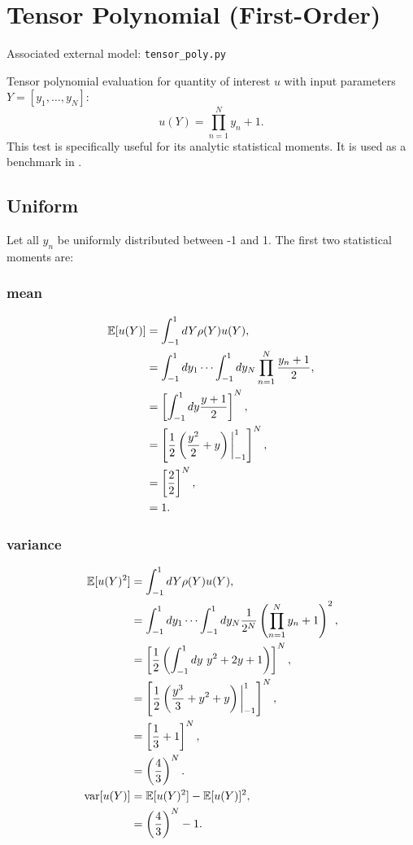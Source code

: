 \section{Tensor Polynomial (First-Order)}
Associated external model: \texttt{tensor\_poly.py}

Tensor polynomial evaluation for quantity of interest $u$ with input parameters $Y=[y_1,\ldots,y_N]$:
\begin{equation}
u(Y) = \prod_{n=1}^N y_n+1.
\end{equation}
This test is specifically useful for its analytic statistical moments.  It is used as a benchmark in
\cite{ayreseaton2015}.

\subsection{Uniform}
Let all $y_n$ be uniformly distributed between -1 and 1.  The first two statistical moments are:

\subsubsection{mean}
\begin{align}
\mathbb{E}[ u(Y)] &=\int_{-1}^1 dY \rho(Y)u(Y),\\
  &=\int_{-1}^1 dy_1\cdots\int_{-1}^1 dy_N \prod_{n=1}^N \frac{y_n+1}{2},\\
  &=\left[ \int_{-1}^1 dy \frac{y+1}{2}\right]^N,\\
  &=\left[\frac{1}{2}\left(\frac{y^2}{2}+y\right)\bigg|_{-1}^1\right]^N,\\
  &=\left[\frac{2}{2}\right]^N,\\
  &=1.
\end{align}

\subsubsection{variance}
\begin{align}
\mathbb{E}[ u(Y)^2] &= \int_{-1}^1 dY \rho(Y)u(Y),\\
  &=\int_{-1}^1 dy_1\cdots\int_{-1}^1 dy_N \frac{1}{2^N} \left(\prod_{n=1}^N y_n+1\right)^2,\\
  &=\left[\frac{1}{2}\left(\int_{-1}^1 dy\ y^2+2y+1 \right)\right]^N,\\
  &=\left[\frac{1}{2}\left(\frac{y^3}{3}+y^2+y \right)\bigg|_{-1}^1 \right]^N,\\
  &=\left[\frac{1}{3}+1\right]^N, \\
  &=\left(\frac{4}{3}\right)^N.\\
\text{var}[u(Y)] &= \mathbb{E}[ u(Y)^2]-\mathbb{E}[ u(Y)]^2,\\
  &= \left(\frac{4}{3}\right)^N-1.
\end{align}


